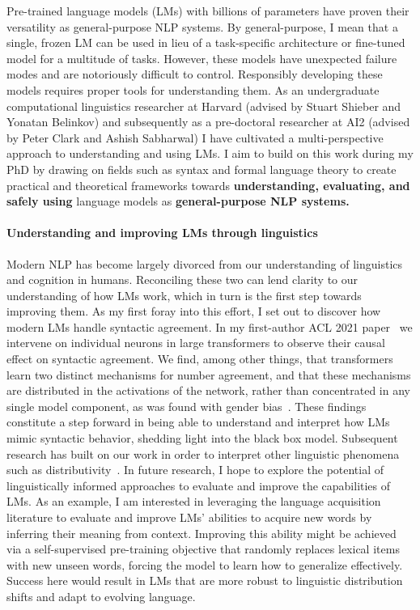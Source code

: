 \documentclass[11pt]{article}
\begin{document}
Pre-trained language models (LMs) with billions of parameters 
have proven their versatility 
as general-purpose NLP systems. 
By general-purpose, I mean that a single, frozen LM can be used 
in lieu of a task-specific architecture or fine-tuned model 
for a multitude of tasks.
However, these models have unexpected failure modes 
and are notoriously difficult to control.
Responsibly developing these models
requires proper tools for understanding them.
As an undergraduate computational linguistics researcher at Harvard 
(advised by Stuart Shieber and Yonatan Belinkov)
and subsequently as a pre-doctoral researcher at AI2 
(advised by Peter Clark and Ashish Sabharwal)
I have cultivated a multi-perspective approach to understanding and using LMs.
I aim to build on this work during my PhD
by drawing on fields such as syntax and formal language theory 
to create practical and theoretical frameworks  
towards \textbf{understanding, evaluating, and safely using} language models 
as \textbf{general-purpose NLP systems.}

\paragraph{Understanding and improving LMs through linguistics}

Modern NLP has become largely divorced 
from our understanding of linguistics and cognition in humans.
Reconciling these two can lend clarity to our understanding of how LMs work, 
which in turn is the first step towards improving them.
As my first foray into this effort, I set out to 
discover how modern LMs handle syntactic agreement.
In my first-author ACL 2021 paper~\cite{finlayson-etal-2021-causal}
we intervene on individual neurons in large transformers 
to observe their causal effect on syntactic agreement.
We find, among other things, that transformers learn 
two distinct mechanisms for number agreement,
and that these mechanisms are distributed 
in the activations of the network, 
rather than concentrated in any single model component,
as was found with gender bias~\cite{Vig2020InvestigatingGB}.
These findings constitute a step forward 
in being able to understand and interpret
how LMs mimic syntactic behavior,
shedding light into the black box model.
Subsequent research has built on our work 
in order to interpret other linguistic phenomena 
such as distributivity~\cite{Ban2022TestingPL}.
In future research, I hope to explore 
the potential of linguistically informed approaches
to evaluate and improve the capabilities of LMs. 
As an example, I am interested in leveraging 
the language acquisition literature
to evaluate and improve LMs' abilities 
to acquire new words by inferring their meaning from context.
Improving this ability might be achieved 
via a self-supervised pre-training objective 
that randomly replaces lexical items with new unseen words, 
forcing the model to learn how to generalize effectively.
Success here would result in LMs that are 
more robust to linguistic distribution shifts
and adapt to evolving language.
\end{document}
